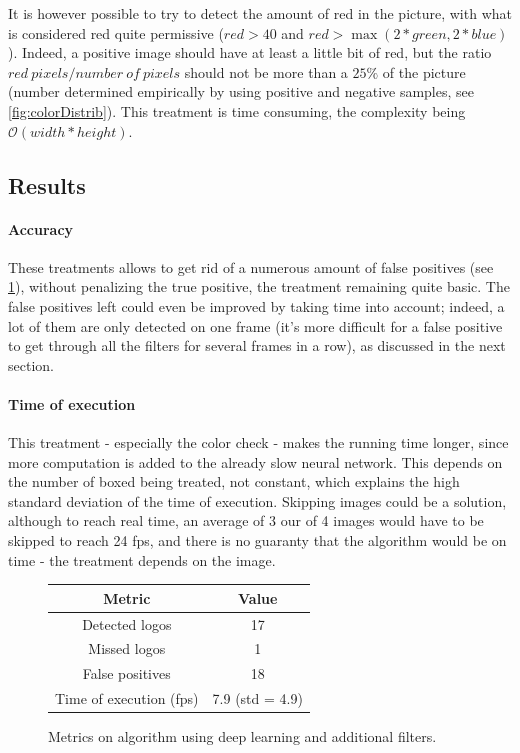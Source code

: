 \documentclass[12pt]{article}%
\begin{document}
It is however possible to try to detect the amount of red in the picture, with what is considered red quite permissive ($red > 40$ and $red > \max(2*green, 2*blue)$). Indeed, a positive image should have at least a little bit of red, but the ratio $red\ pixels/number\ of\ pixels$ should not be more than a $25\%$ of the picture (number determined empirically by using positive and negative samples, see \ref{fig:colorDistrib}). This treatment is time consuming, the complexity being $\mathcal{O}(width*height)$.

\subsection{Results}

\paragraph{Accuracy}
These treatments allows to get rid of a numerous amount of false positives (see \ref{fig:correctedDeepLearningResults}), without penalizing the true positive, the treatment remaining quite basic. The false positives left could even be improved by taking time into account; indeed, a lot of them are only detected on one frame (it's more difficult for a false positive to get through all the filters for several frames in a row), as discussed in the next section. 

\paragraph{Time of execution}
This treatment - especially the color check - makes the running time longer, since more computation is added to the already slow neural network. This depends on the number of boxed being treated, not constant, which explains the high standard deviation of the time of execution. Skipping images could be a solution, although to reach real time, an average of 3 our of 4 images would have to be skipped to reach 24 fps, and there is no guaranty that the algorithm would be on time - the treatment depends on the image.

\begin{figure}
    \centering
        \begin{tabular}{c | c}
        Metric                  & Value \\
        \hline
        Detected logos          & 17 \\
        Missed logos            & 1 \\
        False positives         & 18 \\
        Time of execution (fps) & 7.9 (std = 4.9) \\
        \end{tabular}
    \caption{Metrics on algorithm using deep learning and additional filters.}
    \label{fig:correctedDeepLearningResults}
\end{figure}
\end{document}
